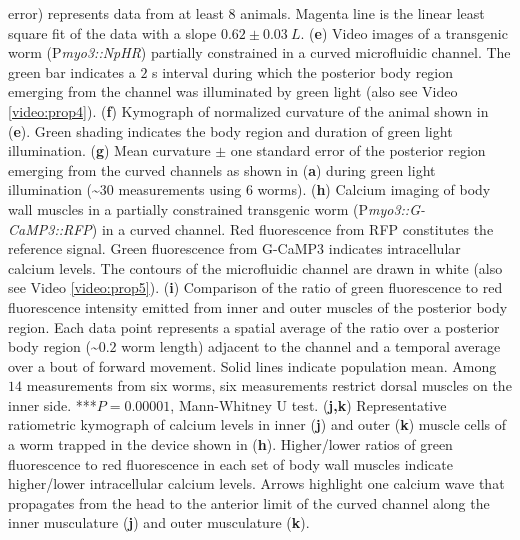 \begin{FPfigure}
{error) represents data from at least 8 animals. Magenta line is the linear least square fit of the 
data with a slope $0.62 \pm 0.03~L$.  
(\textbf{e}) Video images of a transgenic worm (P\textit{myo3::NpHR}) partially constrained in a curved 
microfluidic channel. The green bar indicates a $2$ s interval during which the posterior body 
region emerging from the channel was illuminated by green light (also see Video  \ref{video:prop4}). 
(\textbf{f}) Kymograph of normalized curvature of the animal shown in (\textbf{e}). Green shading indicates the 
body region and duration of green light illumination.  
(\textbf{g}) Mean curvature $\pm$ one standard error of the posterior region emerging from the curved 
channels as shown in (\textbf{a}) during green light illumination (\textasciitilde$30$ measurements using 6 worms). 
(\textbf{h}) Calcium imaging of body wall muscles in a partially constrained transgenic worm 
(P\textit{myo3::G-CaMP3::RFP}) in a curved channel. Red fluorescence from RFP constitutes the 
reference signal. Green fluorescence from G-CaMP3 indicates intracellular calcium levels. The 
contours of the microfluidic channel are drawn in white (also see Video  \ref{video:prop5}). 
(\textbf{i}) Comparison of the ratio of green fluorescence to red fluorescence intensity emitted from inner 
and outer muscles of the posterior body region. Each data point represents a spatial average of 
the ratio over a posterior body region (\textasciitilde$0.2$ worm length) adjacent to the channel and a temporal 
average over a bout of forward movement. Solid lines indicate population mean. Among $14$ 
measurements from six worms, six measurements restrict dorsal muscles on the inner side. ***$P= 0.00001$, Mann-Whitney U test. 
(\textbf{j,k}) Representative ratiometric kymograph of calcium levels in inner (\textbf{j}) and outer (\textbf{k}) muscle 
cells of a worm trapped in the device shown in (\textbf{h}). Higher/lower ratios of green fluorescence to 
red fluorescence in each set of body wall muscles indicate higher/lower intracellular calcium 
levels. Arrows highlight one calcium wave that propagates from the head to the anterior limit of 
the curved channel along the inner musculature (\textbf{j}) and outer musculature (\textbf{k}).\label{fig:prop2}}
\end{FPfigure}
\afterpage{\clearpage}


